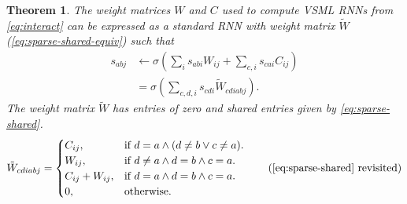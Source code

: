 \documentclass{article}
\newtheorem{theorem}{Theorem}
\newcommand{\approach}{VSML RNNs}
\begin{document}
\begin{theorem}
The weight matrices $W$ and $C$ used to compute {\approach} from \autoref{eq:interact} can be expressed as a standard RNN with weight matrix $\tilde W$ (\autoref{eq:sparse-shared-equiv}) such that
\begin{align}\label{eq:rnn-equiv}
    s_{abj} &\leftarrow \sigma(\sum_i s_{abi} W_{ij} + \sum_{c,i} s_{cai} C_{ij}) \\
    &= \sigma(\sum_{c,d,i} s_{cdi} \tilde W_{cdiabj}).
\end{align}
The weight matrix $\tilde W$ has entries of zero and shared entries given by \autoref{eq:sparse-shared}.
\begin{equation*}
    \tilde W_{cdiabj} = \begin{cases}
        C_{ij}, & \text{if } d = a \land ( d \neq b \lor c \neq a ). \\
        W_{ij}, & \text{if } d \neq a \land d = b \land c = a. \\
        C_{ij} + W_{ij}, & \text{if } d = a \land d = b \land c = a. \\
        0, & \text{otherwise.}
    \end{cases}
    \tag{\ref{eq:sparse-shared} revisited}
\end{equation*}
\end{theorem}
\end{document}
